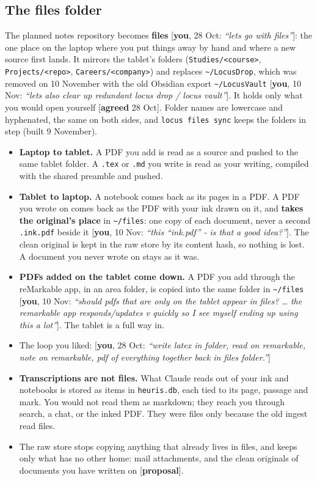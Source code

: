 \documentclass[10pt]{extarticle}
\newcommand{\you}[2]{{\small[\textbf{you}, #1: \textit{``#2''}]}}
\newcommand{\agreed}[1]{{\small[\textbf{agreed} #1]}}
\newcommand{\prop}{{\small[\textbf{proposal}]}}
\newcommand{\Sub}[1]{\subsection*{#1}}
\begin{document}
\Sub{The files folder}
The planned notes repository becomes \textbf{files} \you{28 Oct}{lets go with files}: the one place on the laptop where you put things away by hand and where a new source first lands. It mirrors the tablet's folders (\texttt{Studies/<course>}, \texttt{Projects/<repo>}, \texttt{Careers/<company>}) and replaces \texttt{\textasciitilde/LocusDrop}, which was removed on 10 November with the old Obsidian export \texttt{\textasciitilde/LocusVault} \you{10 Nov}{lets also clear up redundant locus drop / locus vault}. It holds only what you would open yourself \agreed{28 Oct}. Folder names are lowercase and hyphenated, the same on both sides, and \texttt{locus files sync} keeps the folders in step (built 9 November).

\begin{itemize}
\item \textbf{Laptop to tablet.} A PDF you add is read as a source and pushed to the same tablet folder. A \texttt{.tex} or \texttt{.md} you write is read as your writing, compiled with the shared preamble and pushed.
\item \textbf{Tablet to laptop.} A notebook comes back as its pages in a PDF. A PDF you wrote on comes back as the PDF with your ink drawn on it, and \textbf{takes the original's place} in \texttt{\textasciitilde/files}: one copy of each document, never a second \texttt{.ink.pdf} beside it \you{10 Nov}{this ``ink.pdf'' - is that a good idea?}. The clean original is kept in the raw store by its content hash, so nothing is lost. A document you never wrote on stays as it was.
\item \textbf{PDFs added on the tablet come down.} A PDF you add through the reMarkable app, in an area folder, is copied into the same folder in \texttt{\textasciitilde/files} \you{10 Nov}{should pdfs that are only on the tablet appear in files? \ldots{} the remarkable app responds/updates v quickly so I see myself ending up using this a lot}. The tablet is a full way in.
\item The loop you liked: \you{28 Oct}{write latex in folder, read on remarkable, note on remarkable, pdf of everything together back in files folder.}
\item \textbf{Transcriptions are not files.} What Claude reads out of your ink and notebooks is stored as items in \texttt{heuris.db}, each tied to its page, passage and mark. You would not read them as markdown; they reach you through search, a chat, or the inked PDF. They were files only because the old ingest read files.
\item The raw store stops copying anything that already lives in files, and keeps only what has no other home: mail attachments, and the clean originals of documents you have written on \prop.
\end{itemize}
\end{document}
